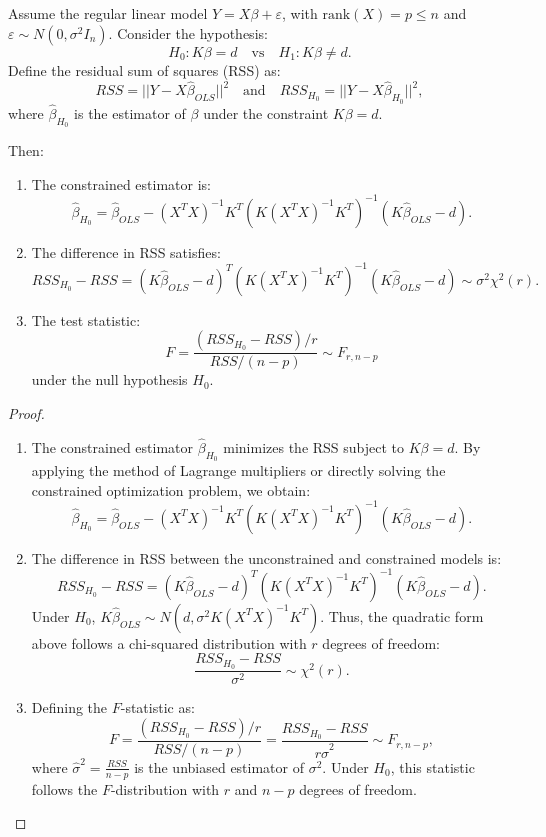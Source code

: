 \documentclass[open=any, 11pt,paper=A4]{scrreprt}
\begin{document}
\begin{theorem}
Assume the regular linear model \(Y = X\beta + \varepsilon\), with \(\text{rank}(X) = p \le n\) and \(\varepsilon \sim N(0, \sigma^2 I_n)\). Consider the hypothesis:
\[
H_0: K\beta = d \quad \text{vs} \quad H_1: K\beta \neq d.
\]
Define the residual sum of squares (RSS) as:
\[
RSS = ||Y - X\hat{\beta}_{OLS}||^2 \quad \text{and} \quad RSS_{H_0} = ||Y - X\hat{\beta}_{H_0}||^2,
\]
where \(\hat{\beta}_{H_0}\) is the estimator of \(\beta\) under the constraint \(K\beta = d\).

Then:
\begin{enumerate}
    \item The constrained estimator is:
    \[
    \hat{\beta}_{H_0} = \hat{\beta}_{OLS} - (X^TX)^{-1} K^T (K (X^TX)^{-1} K^T)^{-1} (K\hat{\beta}_{OLS} - d).
    \]
    
    \item The difference in RSS satisfies:
    \[
    RSS_{H_0} - RSS = (K \hat{\beta}_{OLS} - d)^T (K (X^TX)^{-1} K^T)^{-1} (K \hat{\beta}_{OLS} - d) \sim \sigma^2 \chi^2(r).
    \]
    
    \item The test statistic:
    \[
    F = \frac{(RSS_{H_0} - RSS)/r}{RSS/(n - p)} \sim F_{r, n - p}
    \]
    under the null hypothesis \(H_0\).
\end{enumerate}
\end{theorem}

\begin{proof}
\begin{enumerate}
    \item 
    The constrained estimator \(\hat{\beta}_{H_0}\) minimizes the RSS subject to \(K\beta = d\). By applying the method of Lagrange multipliers or directly solving the constrained optimization problem, we obtain:
    \[
    \hat{\beta}_{H_0} = \hat{\beta}_{OLS} - (X^TX)^{-1} K^T (K (X^TX)^{-1} K^T)^{-1} (K\hat{\beta}_{OLS} - d).
    \]
    
    \item 
    The difference in RSS between the unconstrained and constrained models is:
    \[
    RSS_{H_0} - RSS = (K \hat{\beta}_{OLS} - d)^T (K (X^TX)^{-1} K^T)^{-1} (K \hat{\beta}_{OLS} - d).
    \]
    Under \(H_0\), \(K\hat{\beta}_{OLS} \sim N(d, \sigma^2 K (X^TX)^{-1} K^T)\). Thus, the quadratic form above follows a chi-squared distribution with \(r\) degrees of freedom:
    \[
    \frac{RSS_{H_0} - RSS}{\sigma^2} \sim \chi^2(r).
    \]
    
    \item 
    Defining the \(F\)-statistic as:
    \[
    F = \frac{(RSS_{H_0} - RSS)/r}{RSS/(n - p)} = \frac{RSS_{H_0} - RSS}{r \hat{\sigma}^2} \sim F_{r, n - p},
    \]
    where \(\hat{\sigma}^2 = \frac{RSS}{n - p}\) is the unbiased estimator of \(\sigma^2\). Under \(H_0\), this statistic follows the \(F\)-distribution with \(r\) and \(n - p\) degrees of freedom.
\end{enumerate}
\end{proof}
\end{document}
